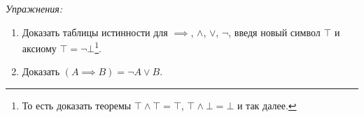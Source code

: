 {\it Упражнения:}
\begin{enumerate}
	\item{}Доказать таблицы истинности для $\implies$, $\land$, $\lor$, $\lnot$, введя
	новый символ $\top$ и аксиому $\top=\lnot\bot$\footnote{
		То есть доказать теоремы $\top\land\top=\top$, $\top\land\bot=\bot$ и так далее.
	}.
	\item{}Доказать $(A\implies B)=\lnot A\lor B$.
\end{enumerate}

\pagebreak

